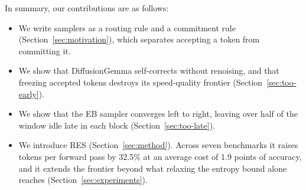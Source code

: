 In summary, our contributions are as follows:
\begin{itemize}
    \item We write samplers as a routing rule and a commitment rule (Section~\ref{sec:motivation}), which separates accepting a token from committing it.
    \item We show that DiffusionGemma self-corrects without renoising, and that freezing accepted tokens destroys its speed-quality frontier (Section~\ref{sec:too-early}).
    \item We show that the EB sampler converges left to right, leaving over half of the window idle late in each block (Section~\ref{sec:too-late}).
    \item We introduce RES (Section~\ref{sec:method}). Across seven benchmarks it raises tokens per forward pass by 32.5\% at an average cost of 1.9 points of accuracy, and it extends the frontier beyond what relaxing the entropy bound alone reaches (Section~\ref{sec:experiments}).
\end{itemize}
